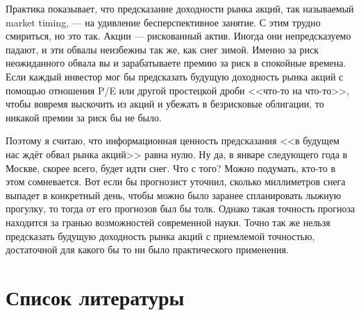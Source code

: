 Практика показывает, что предсказание доходности рынка акций, так называемый market timing, --- на удивление бесперспективное занятие. С этим трудно смириться, но это так. Акции --- рискованный актив. Иногда они непредсказуемо падают, и эти обвалы неизбежны так же, как снег зимой. Именно за риск неожиданного обвала вы и зарабатываете премию за риск в спокойные времена. Если каждый инвестор мог бы предсказать будущую доходность рынка акций с помощью отношения P/E или другой простецкой дроби <<что-то на что-то>>, чтобы вовремя выскочить из акций и убежать в безрисковые облигации, то никакой премии за риск бы не было.

Поэтому я считаю, что информационная ценность предсказания <<в будущем нас ждёт обвал рынка акций>> равна нулю. Ну да, в январе следующего года в Москве, скорее всего, будет идти снег. Что с того? Можно подумать, кто-то в этом сомневается. Вот если бы прогнозист уточнил, сколько миллиметров снега выпадет в конкретный день, чтобы можно было заранее спланировать лыжную прогулку, то тогда от его прогнозов был бы толк. Однако такая точность прогноза находится за гранью возможностей современной науки. Точно так же нельзя предсказать будущую доходность рынка акций с приемлемой точностью, достаточной для какого бы то ни было практического применения.

\section*{Список литературы}
\en{
\printbibliography[heading = none]
}


